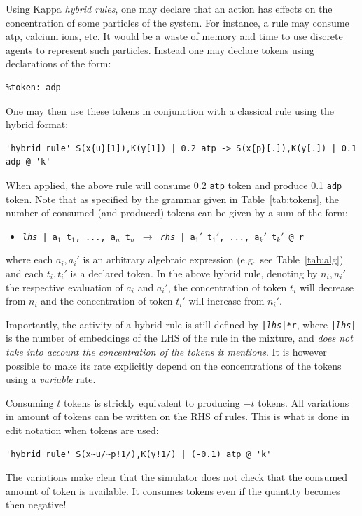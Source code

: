 \documentclass[11pt]{book}
\def\ttt#1{\texttt{#1}}
\def\rar{\rightarrow}
\def\eg{e.g.~}
\def\ITE#1{\begin{itemize}#1\end{itemize}}
\def\imp#1{\emph{#1}\index{#1}}
\begin{document}
Using Kappa \imp{hybrid rules}, one may declare that an action has
effects on the concentration of some particles of the system. For
instance, a rule may consume atp, calcium ions, etc. It would be a waste
of memory and time to use discrete agents to represent such
particles. Instead one may declare tokens using
declarations of the form:
\begin{lstlisting}[language=kappa]
%token: atp
%token: adp
\end{lstlisting}
One may then use these tokens in conjunction with a classical rule
using the hybrid format:
\begin{lstlisting}[language=kappa]
'hybrid rule' S(x{u}[1]),K(y[1]) | 0.2 atp -> S(x{p}[.]),K(y[.]) | 0.1 adp @ 'k'
\end{lstlisting}
When applied, the above rule will consume 0.2 \ttt{atp} token and
produce 0.1 \ttt{adp} token. Note that as specified by the grammar
given in Table~\ref{tab:tokens}, the number of consumed (and produced)
tokens can be given by a sum of the form: \ITE{
\item[] \ttt{\textit{lhs} | a$_1$ t$_1$, ..., a$_n$ t$_n$ $\rar$
  \textit{rhs} | a$_1'$ t$_1'$, ..., a$_k'$ t$_k'$ @ r} } where each
$a_i,a_i'$ is an arbitrary algebraic expression
({\eg}see Table~\ref{tab:alg}) and each $t_i,t_i'$ is a
declared token. In the above hybrid rule, denoting by  $n_i,n_i'$ the
respective evaluation of $a_i$ and $a_i'$, the concentration of token $t_i$ will
decrease from $n_i$ and the concentration of token $t_i'$ will
increase from $n_i'$.

Importantly, the activity of a hybrid rule is still
defined by \ttt{|\textit{lhs}|*r}, where \ttt{|\textit{lhs}|} is
the number of embeddings of the LHS of the rule in the mixture, and
\emph{does not take into account the concentration of the tokens it
  mentions}. It is however possible to make its rate explicitly
depend on the concentrations of the tokens using a \imp{variable}
rate.

Consuming $t$ tokens is strickly equivalent to producing $-t$
tokens. All variations in amount of tokens can be written on the RHS
of rules. This is what is done in edit notation when tokens
are used:
\begin{lstlisting}[language=kappa]
'hybrid rule' S(x~u/~p!1/),K(y!1/) | (-0.1) atp @ 'k'
\end{lstlisting}

The variations make clear that the simulator
does not check that the consumed amount of token is available. It
consumes tokens even if the quantity becomes then negative!
\end{document}

